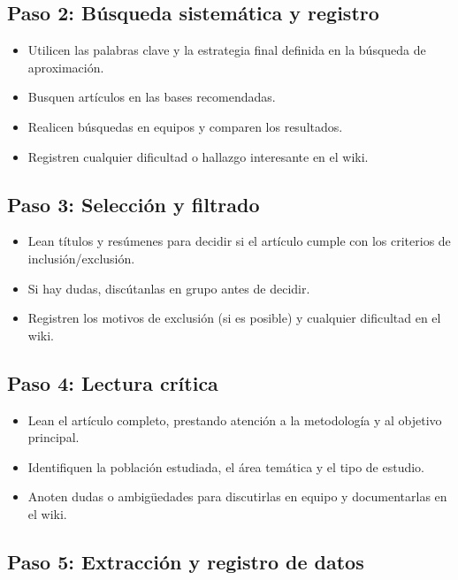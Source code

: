 \documentclass[
  letterpaper,
]{book}
\providecommand{\tightlist}{%
  \setlength{\itemsep}{0pt}\setlength{\parskip}{0pt}}\usepackage{longtable,booktabs,array}
\begin{document}
\subsection{Paso 2: Búsqueda sistemática y
registro}\label{paso-2-buxfasqueda-sistemuxe1tica-y-registro}

\begin{itemize}
\tightlist
\item
  Utilicen las palabras clave y la estrategia final definida en la
  búsqueda de aproximación.
\item
  Busquen artículos en las bases recomendadas.
\item
  Realicen búsquedas en equipos y comparen los resultados.
\item
  Registren cualquier dificultad o hallazgo interesante en el wiki.
\end{itemize}

\subsection{Paso 3: Selección y
filtrado}\label{paso-3-selecciuxf3n-y-filtrado}

\begin{itemize}
\tightlist
\item
  Lean títulos y resúmenes para decidir si el artículo cumple con los
  criterios de inclusión/exclusión.
\item
  Si hay dudas, discútanlas en grupo antes de decidir.
\item
  Registren los motivos de exclusión (si es posible) y cualquier
  dificultad en el wiki.
\end{itemize}

\subsection{Paso 4: Lectura crítica}\label{paso-4-lectura-cruxedtica}

\begin{itemize}
\tightlist
\item
  Lean el artículo completo, prestando atención a la metodología y al
  objetivo principal.
\item
  Identifiquen la población estudiada, el área temática y el tipo de
  estudio.
\item
  Anoten dudas o ambigüedades para discutirlas en equipo y documentarlas
  en el wiki.
\end{itemize}

\subsection{Paso 5: Extracción y registro de
datos}\label{paso-5-extracciuxf3n-y-registro-de-datos}
\end{document}
